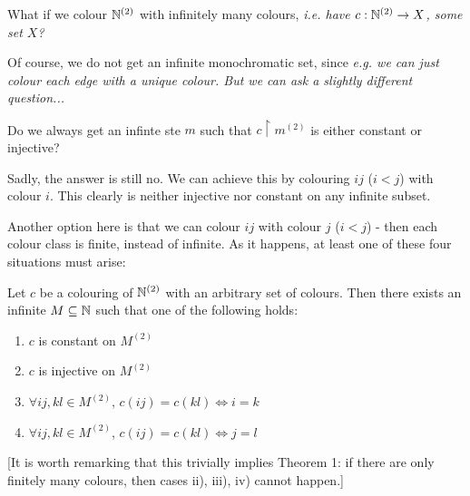 \documentclass[10pt]{article}
\begin{document}
What if we colour $\mathbb{N}^{(2)}$ with infinitely many colours, \it{i.e.} have $c:\mathbb{N}^{(2)}\rightarrow X$, some set $X$?

Of course, we do not get an infinite monochromatic set, since \it{e.g.} we can just colour each edge with a unique colour. But we can ask a slightly different question...

Do we always get an infinte ste $m$ such that $c\restriction m^{(2)}$ is either constant or injective?

Sadly, the answer is still no. We can achieve this by colouring $ij$ ($i<j$) with colour $i$. This clearly is neither injective nor constant on any infinite subset.

Another option  here is that we can colour $ij$ with colour $j$ ($i<j$) - then each colour class is finite, instead of infinite. As it happens, at least one of these four situations must arise:

\begin{theorem}
    Let $c$ be a colouring of $\mathbb{N}^{(2)}$ with an arbitrary set of colours. Then there exists an infinite $M\subseteq \mathbb{N}$ such that one of the following holds:
    \begin{enumerate}[label=\roman*)]
        \item $c$ is constant on $M^{(2)}$
        \item $c$ is injective on $M^{(2)}$
        \item $\forall ij,kl \in M^{(2)}$, $c(ij) = c(kl)\iff i = k$
        \item $\forall ij,kl \in M^{(2)}$, $c(ij) = c(kl)\iff j = l$
    \end{enumerate}
\end{theorem}

[It is worth remarking that this trivially implies Theorem 1: if there are only finitely many colours, then cases ii), iii), iv) cannot happen.]
\end{document}
